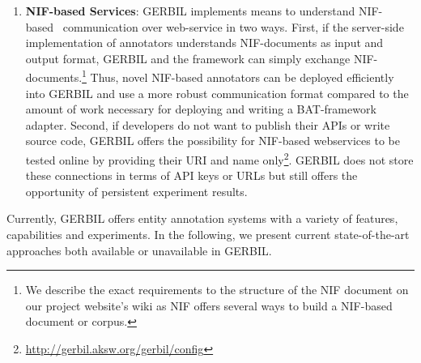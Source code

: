 \begin{enumerate}
\item \textbf{NIF-based Services}:
GERBIL implements means to understand NIF-based~\cite{NIF} communication over web-service in two ways.
First, if the server-side implementation of annotators understands NIF-documents as input and output format, GERBIL and the framework can simply exchange NIF-documents.\footnote{We describe the exact requirements to the structure of the NIF document on our project website's wiki as NIF offers several ways to build a NIF-based document or corpus.}
Thus, novel NIF-based annotators can be deployed efficiently into GERBIL and use a more robust communication format compared to the amount of work necessary for deploying and writing a BAT-framework adapter.
Second, if developers do not want to publish their APIs or write source code, GERBIL offers the possibility for NIF-based webservices to be tested online by providing their URI and name only\footnote{\url{http://gerbil.aksw.org/gerbil/config}}. 
GERBIL does not store these connections in terms of API keys or URLs but still offers the opportunity of persistent experiment results.
\end{enumerate}

Currently, GERBIL offers \overallGERBILannotators entity annotation systems with a variety of features, capabilities and experiments.
In the following, we present current state-of-the-art approaches both available or unavailable in GERBIL.

